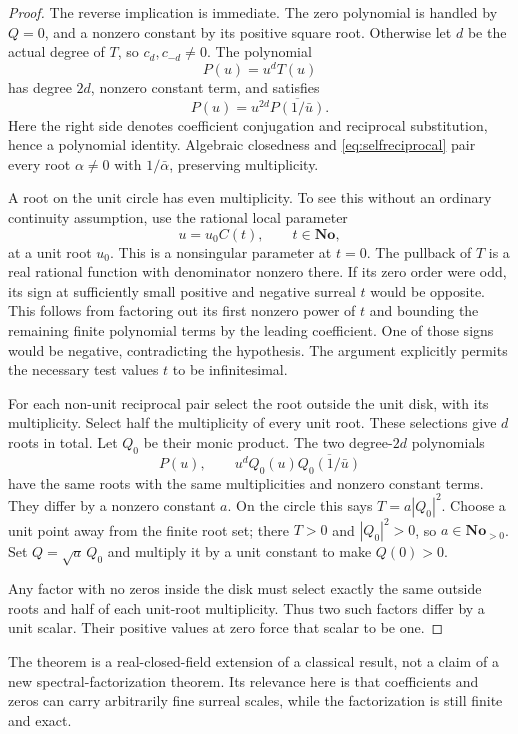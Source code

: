 \documentclass[11pt,letterpaper]{article}
\theoremstyle{definition}
\theoremstyle{remark}
\newcommand{\No}{\mathbf{No}}
\numberwithin{equation}{section}
\begin{document}
\begin{proof}
The reverse implication is immediate. The zero polynomial is handled by $Q=0$, and a nonzero constant by its positive square root. Otherwise let $d$ be the actual degree of $T$, so $c_d,c_{-d}\ne0$. The polynomial
\[
 P(u)=u^dT(u)
\]
has degree $2d$, nonzero constant term, and satisfies
\begin{equation}\label{eq:selfreciprocal}
 P(u)=u^{2d}\overline{P(1/\bar u)}.
\end{equation}
Here the right side denotes coefficient conjugation and reciprocal substitution, hence a polynomial identity. Algebraic closedness and \eqref{eq:selfreciprocal} pair every root $\alpha\ne0$ with $1/\bar\alpha$, preserving multiplicity.

A root on the unit circle has even multiplicity. To see this without an ordinary continuity assumption, use the rational local parameter
\[
 u=u_0C(t),\qquad t\in\No,
\]
at a unit root $u_0$. This is a nonsingular parameter at $t=0$. The pullback of $T$ is a real rational function with denominator nonzero there. If its zero order were odd, its sign at sufficiently small positive and negative surreal $t$ would be opposite. This follows from factoring out its first nonzero power of $t$ and bounding the remaining finite polynomial terms by the leading coefficient. One of those signs would be negative, contradicting the hypothesis. The argument explicitly permits the necessary test values $t$ to be infinitesimal.

For each non-unit reciprocal pair select the root outside the unit disk, with its multiplicity. Select half the multiplicity of every unit root. These selections give $d$ roots in total. Let $Q_0$ be their monic product. The two degree-$2d$ polynomials
\[
 P(u),\qquad u^dQ_0(u)\overline{Q_0(1/\bar u)}
\]
have the same roots with the same multiplicities and nonzero constant terms. They differ by a nonzero constant $a$. On the circle this says $T=a|Q_0|^2$. Choose a unit point away from the finite root set; there $T>0$ and $|Q_0|^2>0$, so $a\in\No_{>0}$. Set $Q=\sqrt a\,Q_0$ and multiply it by a unit constant to make $Q(0)>0$.

Any factor with no zeros inside the disk must select exactly the same outside roots and half of each unit-root multiplicity. Thus two such factors differ by a unit scalar. Their positive values at zero force that scalar to be one.
\end{proof}
The theorem is a real-closed-field extension of a classical result, not a claim of a new spectral-factorization theorem. Its relevance here is that coefficients and zeros can carry arbitrarily fine surreal scales, while the factorization is still finite and exact.
\end{document}
